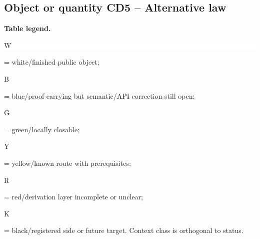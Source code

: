 \subsection*{Object or quantity CD5 -- Alternative law}
\hypertarget{objproof:CD5}{}
\par\smallskip\noindent\begin{minipage}{0.99\linewidth}\footnotesize\raggedright\textbf{Table legend.} \colorbox{white}{\strut W} = white/finished public object; \colorbox{cyan!20}{\strut B} = blue/proof-carrying but semantic/API correction still open; \colorbox{green!18}{\strut G} = green/locally closable; \colorbox{yellow!25}{\strut Y} = yellow/known route with prerequisites; \colorbox{red!20}{\strut R} = red/derivation layer incomplete or unclear; \colorbox{black!18}{\strut K} = black/registered side or future target. Context class is orthogonal to status.\end{minipage}\par\vspace{0.25em}
